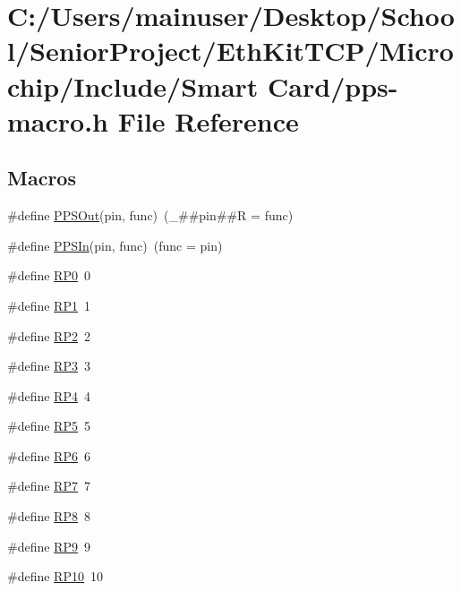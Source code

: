\hypertarget{pps-macro_8h}{}\section{C\+:/\+Users/mainuser/\+Desktop/\+School/\+Senior\+Project/\+Eth\+Kit\+T\+C\+P/\+Microchip/\+Include/\+Smart Card/pps-\/macro.h File Reference}
\label{pps-macro_8h}
\subsection*{Macros}
\begin{DoxyCompactItemize}
\item 
\#define \hyperlink{pps-macro_8h_a53bef79209f9503c33d2d4deb9a38f68}{P\+P\+S\+Out}(pin,  func)~(\+\_\+\#\#pin\#\#R = func)
\item 
\#define \hyperlink{pps-macro_8h_a2635b4ad3fb842aa5fd83aed4ef646bf}{P\+P\+S\+In}(pin,  func)~(func = pin)
\item 
\#define \hyperlink{pps-macro_8h_ad7f94f08cea2af4ebea73fe81a7cec27}{R\+P0}~0
\item 
\#define \hyperlink{pps-macro_8h_a2aa775a4783b0ab418a08cbf991f99f0}{R\+P1}~1
\item 
\#define \hyperlink{pps-macro_8h_ab007f88f5adf1a4132af3c916363550d}{R\+P2}~2
\item 
\#define \hyperlink{pps-macro_8h_a433dca12cf35bab54324bb4c980635f7}{R\+P3}~3
\item 
\#define \hyperlink{pps-macro_8h_a11ceb009a9cc751926c0fa215112a88d}{R\+P4}~4
\item 
\#define \hyperlink{pps-macro_8h_abbc5745deef7e3b20d10bdccc0771dd4}{R\+P5}~5
\item 
\#define \hyperlink{pps-macro_8h_a4295b175e0b35b5d0fa0a2f4ddd5c500}{R\+P6}~6
\item 
\#define \hyperlink{pps-macro_8h_a3f41b08943acfc860b64f28ee037e43a}{R\+P7}~7
\item 
\#define \hyperlink{pps-macro_8h_a523ffc0b5ece9e397e947475fe951dc4}{R\+P8}~8
\item 
\#define \hyperlink{pps-macro_8h_a96986fa0e473c3b95c6d7c479c21ebce}{R\+P9}~9
\item 
\#define \hyperlink{pps-macro_8h_a70239858a0e7e60eac0039884b69d279}{R\+P10}~10
\item 

\end{DoxyCompactItemize}
